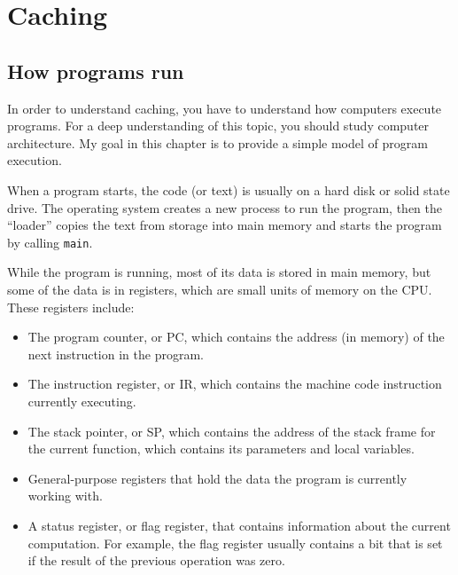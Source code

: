 \documentclass[12pt]{book}
\begin{document}
\chapter{Caching}


\section{How programs run}

In order to understand caching, you have to understand how computers
execute programs.  For a deep understanding of this topic, you should
study computer architecture.  My goal in this chapter is to provide
a simple model of program execution.

When a program starts, the code (or text) is usually on a hard disk
or solid state drive.  The operating system creates a new process to
run the program, then the ``loader''
copies the text from storage into main memory and starts the program by
calling {\tt main}.

While the program is running, most of its data is stored in main
memory, but some of the data is in registers, which are
small units of memory on the CPU.  These registers include:

\begin{itemize}

\item The program counter, or PC, which contains the address (in
  memory) of the next instruction in the program.

\item The instruction register, or IR, which contains the machine code
  instruction currently executing.

\item The stack pointer, or SP, which contains the address of the
  stack frame for the current function, which contains its parameters
  and local variables.

\item General-purpose registers that hold the data the program is
  currently working with.

\item A status register, or flag register, that contains information
  about the current computation.  For example, the flag register
  usually contains a bit that is set if the result of the previous
  operation was zero.

\end{itemize}
\end{document}

